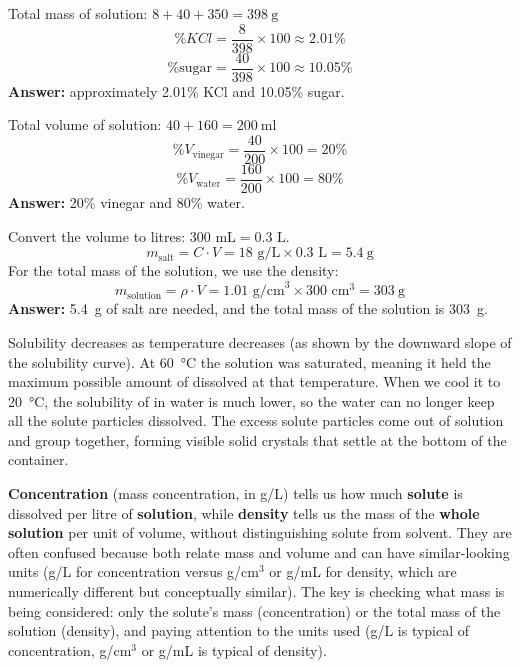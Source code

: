 \documentclass[11pt,a4paper]{article}
\begin{document}
\begin{solucioneng}
Total mass of solution: $8 + 40 + 350 = \qty{398}{\gram}$
\[
\%KCl = \frac{8}{398} \times 100 \approx 2.01\%
\]
\[
\%\text{sugar} = \frac{40}{398} \times 100 \approx 10.05\%
\]
\textbf{Answer:} approximately 2.01\% KCl and 10.05\% sugar.
\end{solucioneng}

\begin{solucioneng}
Total volume of solution: $40 + 160 = \qty{200}{\milli\litre}$
\[
\%V_{\text{vinegar}} = \frac{40}{200} \times 100 = 20\%
\]
\[
\%V_{\text{water}} = \frac{160}{200} \times 100 = 80\%
\]
\textbf{Answer:} 20\% vinegar and 80\% water.
\end{solucioneng}

\begin{solucioneng}
Convert the volume to litres: $300 \text{ mL} = 0.3 \text{ L}$.
\[
m_{\text{salt}} = C \cdot V = 18 \text{ g/L} \times 0.3 \text{ L} = \qty{5.4}{\gram}
\]
For the total mass of the solution, we use the density:
\[
m_{\text{solution}} = \rho \cdot V = 1.01 \text{ g/cm}^3 \times 300 \text{ cm}^3 = \qty{303}{\gram}
\]
\textbf{Answer:} \qty{5.4}{\gram} of salt are needed, and the total mass of the solution is \qty{303}{\gram}.
\end{solucioneng}

\begin{solucioneng}
Solubility decreases as temperature decreases (as shown by the downward slope of the  solubility curve). At \SI{60}{\celsius} the solution was saturated, meaning it held the maximum possible amount of dissolved  at that temperature. When we cool it to \SI{20}{\celsius}, the solubility of  in water is much lower, so the water can no longer keep all the solute particles dissolved. The excess solute particles come out of solution and group together, forming visible solid crystals that settle at the bottom of the container.
\end{solucioneng}

\begin{solucioneng}
\textbf{Concentration} (mass concentration, in g/L) tells us how much \textbf{solute} is dissolved per litre of \textbf{solution}, while \textbf{density} tells us the mass of the \textbf{whole solution} per unit of volume, without distinguishing solute from solvent. They are often confused because both relate mass and volume and can have similar-looking units (g/L for concentration versus g/cm$^3$ or g/mL for density, which are numerically different but conceptually similar). The key is checking what mass is being considered: only the solute's mass (concentration) or the total mass of the solution (density), and paying attention to the units used (g/L is typical of concentration, g/cm$^3$ or g/mL is typical of density).
\end{solucioneng}
\end{document}
